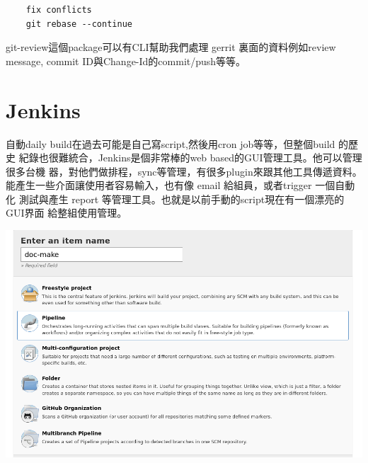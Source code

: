     \begin{verbatim}
    fix conflicts
    git rebase --continue
    \end{verbatim}
    git-review這個package可以有CLI幫助我們處理 gerrit 裏面的資料例如review 
    message, commit ID與Change-Id的commit/push等等。

\section{Jenkins}
  自動daily build在過去可能是自己寫script,然後用cron job等等，但整個build 的歷史
  紀錄也很難統合，Jenkins是個非常棒的web based的GUI管理工具。他可以管理很多台機
  器，對他們做排程，sync等管理，有很多plugin來跟其他工具傳遞資料。
  能產生一些介面讓使用者容易輸入，也有像 email 給組員，或者trigger 一個自動化
  測試與產生 report 等管理工具。也就是以前手動的script現在有一個漂亮的GUI界面
  給整組使用管理。

  \includegraphics[width=\textwidth,height=0.6\textwidth]{images/jenkins.png}

